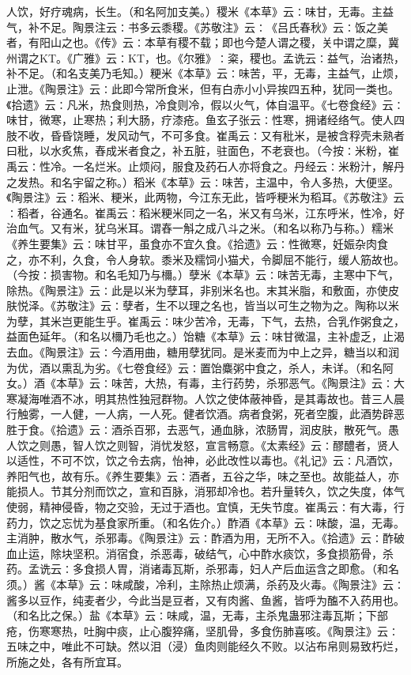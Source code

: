 \documentclass[a4paper,12pt,UTF8,twoside]{ctexbook}
\begin{document}
人饮，好疗魂病，长生。（和名阿加支美。）稷米《本草》云∶味甘，无毒。主益气，补不足。陶景注云∶书多云黍稷。《苏敬注》云∶《吕氏春秋》云∶饭之美者，有阳山之也。《传》云∶本草有稷不载；即也今楚人谓之稷，关中谓之糜，冀州谓之KT。《广雅》云∶KT，也。《尔雅》∶粢，稷也。孟诜云∶益气，治诸热，补不足。（和名支美乃毛知。）粳米《本草》云∶味苦，平，无毒，主益气，止烦，止泄。《陶景注》云∶此即今常所食米，但有白赤小小异挨四五种，犹同一类也。《拾遗》云∶凡米，热食则热，冷食则冷，假以火气，体自温平。《七卷食经》云∶味甘，微寒，止寒热；利大肠，疗漆疮。鱼玄子张云∶性寒，拥诸经络气。使人四肢不收，昏昏饶睡，发风动气，不可多食。崔禹云∶又有秕米，是被含稃壳未熟者曰秕，以水炙焦，舂成米者食之，补五脏，驻面色，不老衰也。（今按∶米粉，崔禹云∶性冷。一名烂米。止烦闷，服食及药石人亦将食之。丹经云∶米粉汁，解丹之发热。和名宇留之称。）稻米《本草》云∶味苦，主温中，令人多热，大便坚。《陶景注》云∶稻米、粳米，此两物，今江东无此，皆呼粳米为稻耳。《苏敬注》云∶稻者，谷通名。崔禹云∶稻米粳米同之一名，米又有乌米，江东呼米，性冷，好治血气。又有米，犹乌米耳。谓舂一斛之成八斗之米。（和名以称乃与称。）糯米《养生要集》云∶味甘平，虽食亦不宜久食。《拾遗》云∶性微寒，妊娠杂肉食之，亦不利，久食，令人身软。黍米及糯饲小猫犬，令脚屈不能行，缓人筋故也。（今按∶损害物。和名毛知乃与檷。）孽米《本草》云∶味苦无毒，主寒中下气，除热。《陶景注》云∶此是以米为孽耳，非别米名也。末其米脂，和敷面，亦使皮肤悦泽。《苏敬注》云∶孽者，生不以理之名也，皆当以可生之物为之。陶称以米为孽，其米岂更能生乎。崔禹云∶味少苦冷，无毒，下气，去热，合乳作粥食之，益面色延年。（和名以檷乃毛也之。）饴糖《本草》云∶味甘微温，主补虚乏，止渴去血。《陶景注》云∶今酒用曲，糖用孽犹同。是米麦而为中上之异，糖当以和润为优，酒以熏乱为劣。《七卷食经》云∶置饴麋粥中食之，杀人，未详。（和名阿女。）酒《本草》云∶味苦，大热，有毒，主行药势，杀邪恶气。《陶景注》云∶大寒凝海唯酒不冰，明其热性独冠群物。人饮之使体蔽神昏，是其毒故也。昔三人晨行触雾，一人健，一人病，一人死。健者饮酒。病者食粥，死者空腹，此酒势辟恶胜于食。《拾遗》云∶酒杀百邪，去恶气，通血脉，浓肠胃，润皮肤，散死气。愚人饮之则愚，智人饮之则智，消忧发怒，宣言畅意。《太素经》云∶醪醴者，贤人以适性，不可不饮，饮之令去病，怡神，必此改性以毒也。《礼记》云∶凡酒饮，养阳气也，故有乐。《养生要集》云∶酒者，五谷之华，味之至也。故能益人，亦能损人。节其分剂而饮之，宣和百脉，消邪却冷也。若升量转久，饮之失度，体气使弱，精神侵昏，物之交验，无过于酒也。宜慎，无失节度。崔禹云∶有大毒，行药力，饮之忘忧为基食家所重。（和名佐介。）酢酒《本草》云∶味酸，温，无毒。主消肿，散水气，杀邪毒。《陶景注》云∶酢酒为用，无所不入。《拾遗》云∶酢破血止运，除块坚积。消宿食，杀恶毒，破结气，心中酢水痰饮，多食损筋骨，杀药。孟诜云∶多食损人胃，消诸毒瓦斯，杀邪毒，妇人产后血运含之即愈。（和名须。）酱《本草》云∶味咸酸，冷利，主除热止烦满，杀药及火毒。《陶景注》云∶酱多以豆作，纯麦者少，今此当是豆者，又有肉酱、鱼酱，皆呼为醢不入药用也。（和名比之保。）盐《本草》云∶味咸，温，无毒，主杀鬼蛊邪注毒瓦斯；下部疮，伤寒寒热，吐胸中痰，止心腹猝痛，坚肌骨，多食伤肺喜咳。《陶景注》云∶五味之中，唯此不可缺。然以泪（浸）鱼肉则能经久不败。以沾布帛则易致朽烂，所施之处，各有所宜耳。
\end{document}

